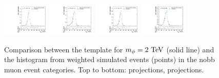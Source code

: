 \begin{figure}[htpb]
  \includegraphics[width=0.2\textwidth]{fig/2Dfit/templateVsReco_VBFRadToWW2000_r0_MJ_mu_HP_nobb_LDy.pdf}
  \includegraphics[width=0.2\textwidth]{fig/2Dfit/templateVsReco_VBFRadToWW2000_r0_MJ_mu_LP_nobb_LDy.pdf}
  \includegraphics[width=0.2\textwidth]{fig/2Dfit/templateVsReco_VBFRadToWW2000_r0_MJ_mu_HP_nobb_HDy.pdf}
  \includegraphics[width=0.2\textwidth]{fig/2Dfit/templateVsReco_VBFRadToWW2000_r0_MJ_mu_LP_nobb_HDy.pdf}\\
  \caption{
    Comparison between the \VBF\RadtoWW template for $m_{\Rad}=2\unit{TeV}$ (solid line) and the histogram from weighted simulated events (points) in the nobb muon event categories.
    Top to bottom: \MVV projections, \MJ projections.
  }
  \label{fig:1dtemplateVsReco_VBFRadToWW2000_Run2}
\end{figure}

